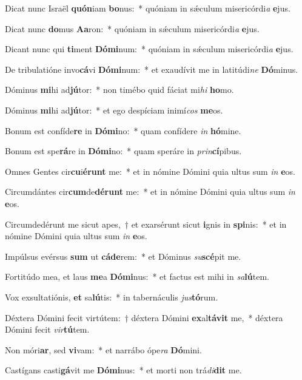\item Dicat nunc Israël \textbf{quón}iam \textbf{bo}nus:~* quóniam in sǽculum misericórdi\textit{a} \textbf{e}jus.
\item Dicat nunc \textbf{do}mus \textbf{A}\textbf{a}ron:~* quóniam in sǽculum misericórdi\textit{a} \textbf{e}jus.
\item Dicant nunc qui \textbf{ti}ment \textbf{Dó}\textbf{mi}num:~* quóniam in sǽculum misericórdi\textit{a} \textbf{e}jus.
\item De tribulatióne invo\textbf{cá}vi \textbf{Dó}\textbf{mi}num:~* et exaudívit me in latitúdi\textit{ne} \textbf{Dó}minus.
\item Dóminus \textbf{mi}hi ad\textbf{jú}tor:~* non timébo quid fáciat mi\textit{hi} \textbf{ho}mo.
\item Dóminus \textbf{mi}hi ad\textbf{jú}tor:~* et ego despíciam inimí\textit{cos} \textbf{me}os.
\item Bonum est confíde\textbf{re} in \textbf{Dó}\textbf{mi}no:~* quam confídere \textit{in} \textbf{hó}mine.
\item Bonum est spe\textbf{rá}re in \textbf{Dó}\textbf{mi}no:~* quam speráre in \textit{prin}\textbf{cí}pibus.
\item Omnes Gentes cir\textbf{cu}i\textbf{é}\textbf{runt} me:~* et in nómine Dómini quia ultus sum \textit{in} \textbf{e}os.
\item Circumdántes cir\textbf{cum}de\textbf{dé}\textbf{runt} me:~* et in nómine Dómini quia ultus sum \textit{in} \textbf{e}os.
\item Circumdedérunt me sicut apes,~† et exarsérunt sicut \textbf{i}gnis in \textbf{spi}nis:~* et in nómine Dómini quia ultus sum \textit{in} \textbf{e}os.
\item Impúlsus evérsus \textbf{sum} ut \textbf{cá}\textbf{de}rem:~* et Dóminus \textit{su}\textbf{scé}pit me.
\item Fortitúdo mea, et laus \textbf{me}a \textbf{Dó}\textbf{mi}nus:~* et factus est mihi in \textit{sa}\textbf{lú}tem.
\item Vox exsultatiónis, \textbf{et} sa\textbf{lú}tis:~* in tabernáculis \textit{jus}\textbf{tó}rum.
\item Déxtera Dómini fecit virtútem:~† déxtera Dómini \textbf{ex}al\textbf{tá}\textbf{vit} me,~* déxtera Dómini fecit \textit{vir}\textbf{tú}tem.
\item Non móri\textbf{ar}, sed \textbf{vi}vam:~* et narrábo ópe\textit{ra} \textbf{Dó}mini.
\item Castígans casti\textbf{gá}vit me \textbf{Dó}\textbf{mi}nus:~* et morti non trá\textit{di}\textbf{dit} me.
